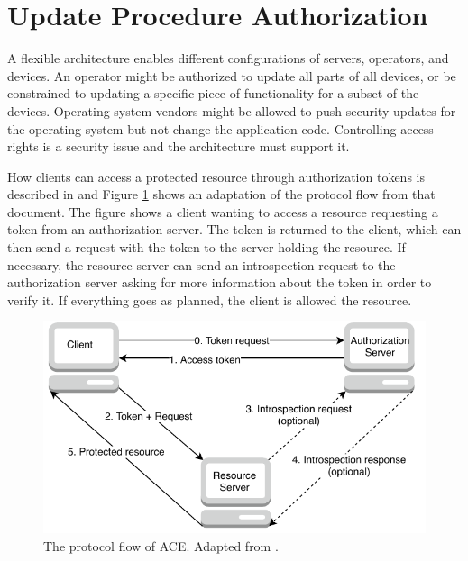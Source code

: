 \documentclass[0-thesis.tex]{subfiles}
\begin{document}
\section{Update Procedure Authorization}
\label{sec:authorization}
A flexible architecture enables different configurations of servers, operators, and
devices. An operator might be authorized to update all parts of all devices, or be
constrained to updating a specific piece of functionality for a subset of the devices.
Operating system vendors might be allowed to push security updates for the operating
system but not change the application code. Controlling access rights is a security issue
and the architecture must support it.

How clients can access a protected resource through authorization tokens is described in
\parencite{ace} and Figure \ref{fig:ace-flow} shows an adaptation of the protocol flow
from that document. The figure shows a client wanting to access a resource requesting a
token from an authorization server. The token is returned to the client, which can then
send a request with the token to the server holding the resource. If necessary, the
resource server can send an introspection request to the authorization server asking for
more information about the token in order to verify it. If everything goes as planned, the
client is allowed the resource.

\begin{figure}
    \caption{The protocol flow of ACE. Adapted from \parencite{ace}.}
    \label{fig:ace-flow}
    \includegraphics{images/ace.pdf}
\end{figure}
\end{document}
